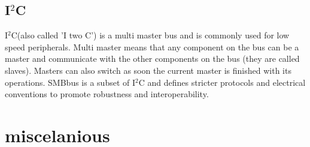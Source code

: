 \documentclass[a4paper]{scrartcl}
\begin{document}
        \subsection{I\(^2\)C}     
            I\(^2\)C(also called 'I two C') is a multi master bus and is commonly used for low speed peripherals. Multi master means that any component on the bus can be a
            master and communicate with the other components on the bus (they are called slaves). Masters can also switch as soon the current master is finished with its
            operations. SMBbus is a subset of I\(^2\)C and defines stricter protocols and electrical conventions to promote robustness and interoperability.
    
    
    
    
    
    
    
    
    \section{miscelanious}
\end{document}
